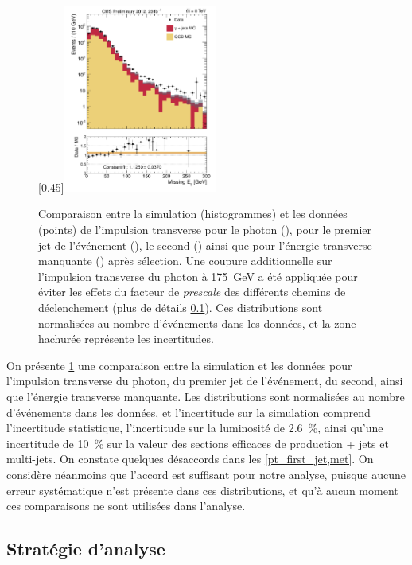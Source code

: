 \begin{figure}[p]
    \subcaptionbox{\label{met}}[0.45\textwidth]{\includegraphics[width=0.45\textwidth]{chapitre4/figs/MET_passedID_log.pdf}}
    \caption{Comparaison entre la simulation (histogrammes) et les données (points) de l'impulsion transverse pour le photon (), pour le premier jet de l'événement (), le second () ainsi que pour l'énergie transverse manquante () après sélection. Une coupure additionnelle sur l'impulsion transverse du photon à \SI{175}{\GeV} a été appliquée pour éviter les effets du facteur de \emph{prescale} des différents chemins de déclenchement (plus de détails \cref{sec:jetmet_strategy}). Ces distributions sont normalisées au nombre d'événements dans les données, et la zone hachurée représente les incertitudes.}
    \label{fig:pt_photon_jet}
\end{figure}

\bigskip

On présente \cref{fig:pt_photon_jet} une comparaison entre la simulation et les données pour l'impulsion transverse du photon, du premier jet de l'événement, du second, ainsi que l'énergie transverse manquante. Les distributions sont normalisées au nombre d'événements dans les données, et l'incertitude sur la simulation comprend l'incertitude statistique, l'incertitude sur la luminosité de \SI{2.6}{\%}, ainsi qu'une incertitude de \SI{10}{\%} sur la valeur des sections efficaces de production \Pphoton + jets et multi-jets. On constate quelques désaccords dans les \cref{pt_first_jet,met}. On considère néanmoins que l'accord est suffisant pour notre analyse, puisque aucune erreur systématique n'est présente dans ces distributions, et qu'à aucun moment ces comparaisons ne sont utilisées dans l'analyse.

\subsection{Stratégie d'analyse} \label{sec:jetmet_strategy}

